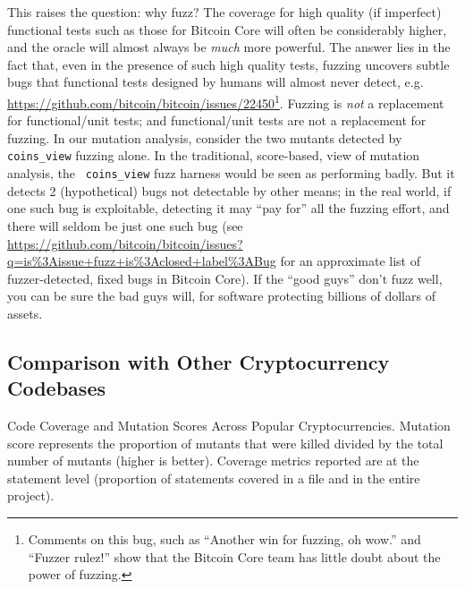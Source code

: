 This raises the question:  why fuzz?  The coverage for high quality
(if imperfect) functional tests such as those for Bitcoin Core will
often be considerably
higher, and the oracle will almost always be \emph{much} more powerful.  The answer lies in the
fact that, even in the presence of such high quality tests, fuzzing
uncovers subtle bugs that functional tests designed by humans will
almost never detect,
e.g. \url{https://github.com/bitcoin/bitcoin/issues/22450}\footnote{Comments
  on this bug, such as ``Another win for fuzzing, oh wow.'' and
  ``Fuzzer rulez!'' show that the Bitcoin Core team has little doubt
  about the power of fuzzing.}.  Fuzzing is \emph{not} a replacement
for functional/unit tests; and functional/unit tests are not a
replacement for fuzzing.  In our mutation analysis, consider the two
mutants detected by {\tt coins\_view} fuzzing alone.  In the
traditional, score-based, view of mutation analysis, the {\tt
  coins\_view} fuzz harness would be seen as performing badly.  But it
detects 2 (hypothetical) bugs not detectable by other means; in the
real world, if one such bug is exploitable, detecting it may ``pay
for'' all the fuzzing effort, and there will seldom be just one such
bug (see
\url{https://github.com/bitcoin/bitcoin/issues?q=is\%3Aissue+fuzz+is\%3Aclosed+label\%3ABug}
for an approximate list of fuzzer-detected, fixed bugs in Bitcoin
Core).  If the ``good guys'' don't fuzz well, you can be sure the bad
guys will, for software protecting billions of dollars of assets.

\subsection{Comparison with Other Cryptocurrency Codebases}

\begin{table}[ht!]
\vspace{2mm}

\caption{Code Coverage and Mutation Scores Across Popular Cryptocurrencies. Mutation score represents the proportion of mutants that were killed divided by the total number of mutants (higher is better). Coverage
metrics reported are at the statement level (proportion of statements covered in a file and in the entire project).}
\label{tab:comparison}
\end{table}

